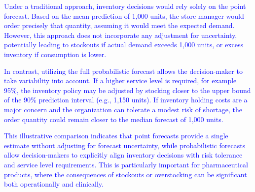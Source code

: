 \documentclass[
  authoryear,
  preprint,
  3p]{elsarticle}
\begin{document}
\textcolor{blue}{Under a traditional approach, inventory decisions would rely solely on the point forecast. Based on the mean prediction of 1,000 units, the store manager would order precisely that quantity, assuming it would meet the expected demand. However, this approach does not incorporate any adjustment for uncertainty, potentially leading to stockouts if actual demand exceeds 1,000 units, or excess inventory if consumption is lower.}

\textcolor{blue}{In contrast, utilizing the full probabilistic forecast allows the decision-maker to take variability into account. If a higher service level is required, for example 95\%, the inventory policy may be adjusted by stocking closer to the upper bound of the 90\% prediction interval (e.g., 1,150 units). If inventory holding costs are a major concern and the organization can tolerate a modest risk of shortage, the order quantity could remain closer to the median forecast of 1,000 units.}

\begin{table}[H]

\caption{\label{tbl-point_vs_probabilistic}Comparison of ordering
decisions under point and probabilistic forecasts - an illustrative
example.}


\end{table}%

\textcolor{blue}{This illustrative comparison indicates that point forecasts provide a single estimate without adjusting for forecast uncertainty, while probabilistic forecasts allow decision-makers to explicitly align inventory decisions with risk tolerance and service level requirements. This is particularly important for pharmaceutical products, where the consequences of stockouts or overstocking can be significant both operationally and clinically.}
\end{document}
